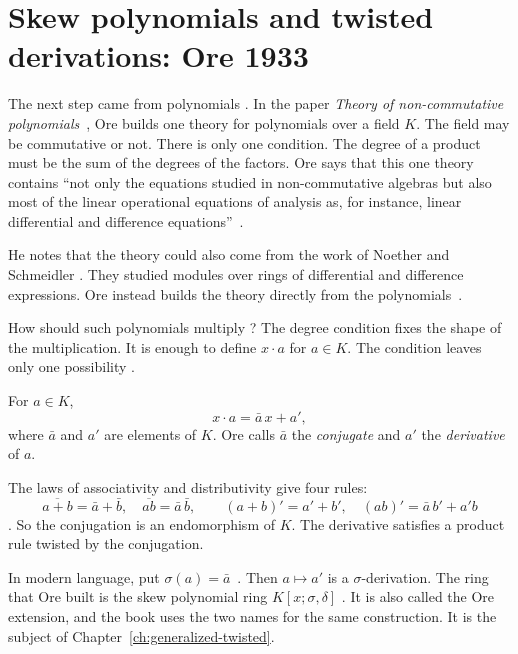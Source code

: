 \section[Skew polynomials and twisted derivations: Ore 1933][Skew polynomials and twisted derivations]{Skew polynomials and twisted derivations: Ore 1933}\label{sec:origins:ore-and-twists}

The next step came from polynomials \cite{Ore1933}. In the paper \emph{Theory
of non-commutative polynomials}~\cite{Ore1933}, Ore builds one theory for
polynomials over a field $K$. The field may be commutative or not. There is
only one condition. The degree of a product must be the sum of the degrees of
the factors. Ore says that this one theory contains ``not only the equations
studied in non-commutative algebras but also most of the linear operational
equations of analysis as, for instance, linear differential and difference
equations''~\cite[p.~480]{Ore1933}.

He notes that the theory could also come from the work of Noether and
Schmeidler \cite[p.~480]{Ore1933}. They studied modules over rings of
differential and difference expressions. Ore instead builds the theory
directly from the polynomials~\cite[p.~480]{Ore1933}.

How should such polynomials multiply \cite[p.~481]{Ore1933}? The degree
condition fixes the shape of the multiplication. It is enough to define
$x\cdot a$ for $a \in K$. The condition leaves only one possibility
\cite[p.~481]{Ore1933}.

\begin{definition}\label{def:origins:ore}
For $a \in K$,
\[
x\cdot a = \bar a\, x + a',
\]
where $\bar a$ and $a'$ are elements of $K$. Ore calls $\bar a$ the
\emph{conjugate} and $a'$ the \emph{derivative} of $a$.
\end{definition}

The laws of associativity and distributivity give four rules:
\[
\overline{a+b} = \bar a + \bar b,\quad \overline{ab} = \bar a\,\bar b,\qquad
(a+b)' = a' + b',\quad (ab)' = \bar a\, b' + a' b
\]
\cite[p.~482, (4)--(5)]{Ore1933}. So the conjugation is an endomorphism of
$K$. The derivative satisfies a product rule twisted by the conjugation.

In modern language, put $\sigma(a) = \bar a$~\cite[p.~481]{Ore1933}. Then $a \mapsto a'$ is a
$\sigma$-derivation. The ring that Ore built is the skew polynomial ring
$K[x;\sigma,\delta]$ \cite[p.~481]{Ore1933}. It is also called the Ore
extension, and the book uses the two names for the same construction. It is
the subject of Chapter~\ref{ch:generalized-twisted}.


